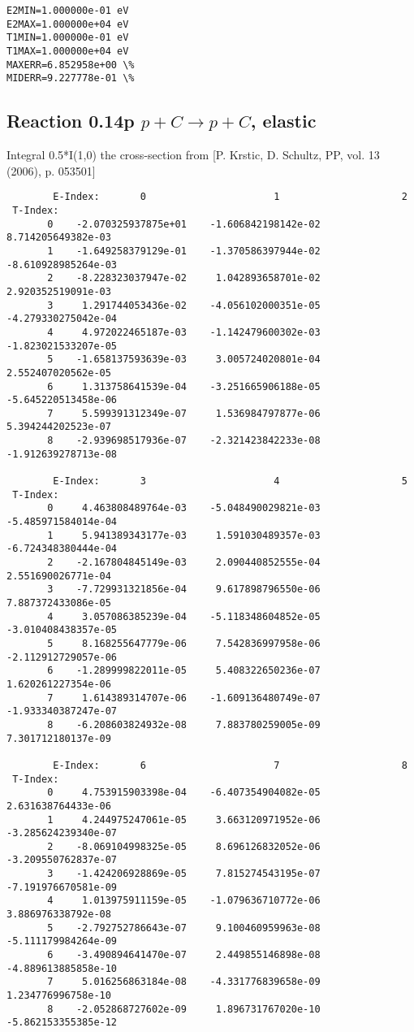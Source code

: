 \documentclass[12pt,dvipdfmx]{article}
\begin{document}
{\begin{small}
\begin{verbatim}
E2MIN=1.000000e-01 eV
E2MAX=1.000000e+04 eV
T1MIN=1.000000e-01 eV
T1MAX=1.000000e+04 eV
MAXERR=6.852958e+00 \%
MIDERR=9.227778e-01 \%
\end{verbatim}\end{small}
\newpage

\subsection{
Reaction 0.14p  $p + C \rightarrow p + C$, elastic}

Integral 0.5*I(1,0) the cross-section from [P. Krstic, D. Schultz, PP, vol. 13 (2006), p. 053501]

\begin{small}\begin{verbatim}
        E-Index:       0                      1                     2
 T-Index:
       0    -2.070325937875e+01    -1.606842198142e-02     8.714205649382e-03
       1    -1.649258379129e-01    -1.370586397944e-02    -8.610928985264e-03
       2    -8.228323037947e-02     1.042893658701e-02     2.920352519091e-03
       3     1.291744053436e-02    -4.056102000351e-05    -4.279330275042e-04
       4     4.972022465187e-03    -1.142479600302e-03    -1.823021533207e-05
       5    -1.658137593639e-03     3.005724020801e-04     2.552407020562e-05
       6     1.313758641539e-04    -3.251665906188e-05    -5.645220513458e-06
       7     5.599391312349e-07     1.536984797877e-06     5.394244202523e-07
       8    -2.939698517936e-07    -2.321423842233e-08    -1.912639278713e-08

        E-Index:       3                      4                     5
 T-Index:
       0     4.463808489764e-03    -5.048490029821e-03    -5.485971584014e-04
       1     5.941389343177e-03     1.591030489357e-03    -6.724348380444e-04
       2    -2.167804845149e-03     2.090440852555e-04     2.551690026771e-04
       3    -7.729931321856e-04     9.617898796550e-06     7.887372433086e-05
       4     3.057086385239e-04    -5.118348604852e-05    -3.010408438357e-05
       5     8.168255647779e-06     7.542836997958e-06    -2.112912729057e-06
       6    -1.289999822011e-05     5.408322650236e-07     1.620261227354e-06
       7     1.614389314707e-06    -1.609136480749e-07    -1.933340387247e-07
       8    -6.208603824932e-08     7.883780259005e-09     7.301712180137e-09

        E-Index:       6                      7                     8
 T-Index:
       0     4.753915903398e-04    -6.407354904082e-05     2.631638764433e-06
       1     4.244975247061e-05     3.663120971952e-06    -3.285624239340e-07
       2    -8.069104998325e-05     8.696126832052e-06    -3.209550762837e-07
       3    -1.424206928869e-05     7.815274543195e-07    -7.191976670581e-09
       4     1.013975911159e-05    -1.079636710772e-06     3.886976338792e-08
       5    -2.792752786643e-07     9.100460959963e-08    -5.111179984264e-09
       6    -3.490894641470e-07     2.449855146898e-08    -4.889613885858e-10
       7     5.016256863184e-08    -4.331776839658e-09     1.234776996758e-10
       8    -2.052868727602e-09     1.896731767020e-10    -5.862153355385e-12


\end{verbatim}
\end{small}}
\end{document}
